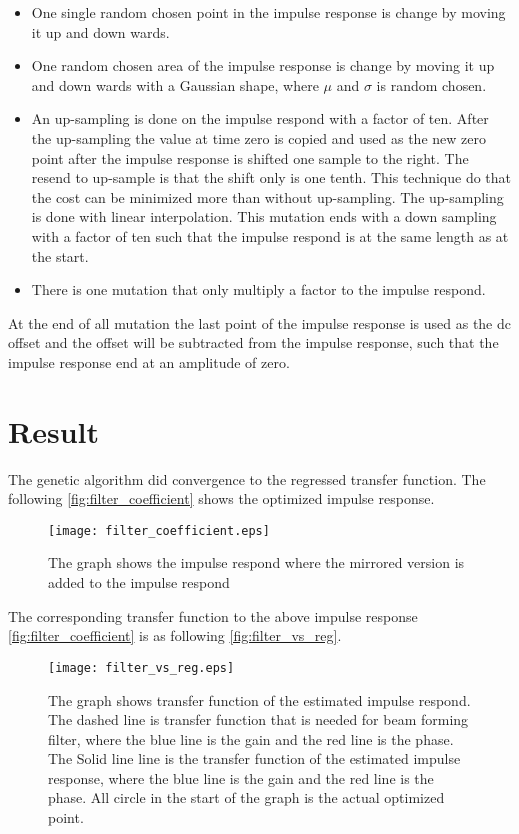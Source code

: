 \begin{itemize}
\item One single random chosen point in the impulse response is change by moving it up and down wards.
\item One random chosen area of the impulse response is change by moving it up and down wards with a Gaussian shape, where $\mu$ and $\sigma$ is random chosen.
\item An up-sampling is done on the impulse respond with a factor of ten. After the up-sampling the value at time zero is copied and used as the new zero point after the impulse response is shifted one sample to the right. The resend to up-sample is that the shift only is one tenth. This technique do that the cost can be minimized more than without up-sampling. The up-sampling is done with linear interpolation. This mutation ends with a down sampling with a factor of ten such that the impulse respond is at the same length as at the start.
\item There is one mutation that only multiply a factor to the impulse respond. 
\end{itemize}

At the end of all mutation the last point of the impulse response is used as the \gls{dc} offset and the offset will be subtracted from the impulse response, such that the impulse response end at an amplitude of zero. 

\section{Result}
The genetic algorithm did convergence to the regressed transfer function. The following \autoref{fig:filter_coefficient} shows the optimized impulse response.

 \begin{figure}[H]
	\centering
	\texttt{[image: filter\_coefficient.eps]}
	\caption{The graph shows the impulse respond where the mirrored version is added to the impulse respond}
		\label{fig:filter_coefficient}
\end{figure}

The corresponding transfer function to the above impulse response \autoref{fig:filter_coefficient} is as following \autoref{fig:filter_vs_reg}.

\begin{figure}[H]
	\centering
	\texttt{[image: filter\_vs\_reg.eps]}
	\caption{The graph shows transfer function of the estimated impulse respond. The dashed line is transfer function that is needed for beam forming filter, where the blue line is the gain and the red line is the phase. The Solid line line is the transfer function of the estimated impulse response, where the blue line is the gain and the red line is the phase. All circle in the start of the graph is the actual optimized point.}
		\label{fig:filter_vs_reg}
\end{figure}



